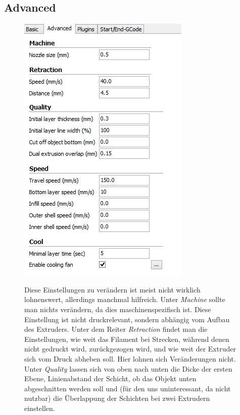 \documentclass[11pt,a4paper]{scrartcl}
\begin{document}
\subsection*{Advanced}
\begin{figure}[ht]
\begin{minipage}{.55\textwidth}
\begin{center}
 \includegraphics[scale=0.7]{res/CuraSettingAdvanced.JPG}
 \end{center}
\end{minipage}
\begin{minipage}{.47\textwidth}
Diese Einstellungen zu verändern ist meist nicht wirklich lohnenswert, allerdings manchmal hilfreich. Unter \textit{Machine} sollte man nichts verändern, da dies maschinenspezifisch ist. Diese Einstellung ist nicht druckrelevant, sondern abhängig vom Aufbau des Extruders. Unter dem Reiter \textit{Retraction} findet man die Einstellungen, wie weit das Filament bei Strecken, während denen nicht gedruckt wird, zurückgezogen wird, und wie weit der Extruder sich vom Druck abheben soll. Hier lohnen sich Veränderungen nicht.\\
Unter \textit{Quality} lassen sich von oben nach unten die Dicke der ersten Ebene, Linienabstand der Schicht, ob das Objekt unten abgeschnitten werden soll und (für den uns uninteressant, da nicht nutzbar) die Überlappung der Schichten bei zwei Extrudern einstellen.\\
\end{minipage}
\end{figure}
\end{document}

